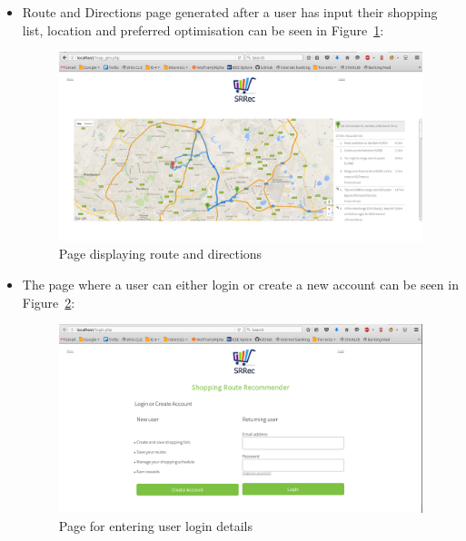 \documentclass[10pt,twocolumn]{witseiepaper}
\begin{document}
\begin{itemize}
			\item Route and Directions page generated after a user has input their shopping list, location and preferred optimisation can be seen in Figure~\ref{map page}:
			\begin{figure}[htbp]
				\centering
				\includegraphics[width =\columnwidth]{../images/map_gen_new.png}
				\caption{Page displaying route and directions}
				\label{map page}
			\end{figure}
			
			\item The page where a user can either login or create a new account can be seen in Figure~\ref{login page}:
			\begin{figure}[htbp]
				\centering
				\includegraphics[width = \columnwidth]{../images/login_new.png}
				\caption{Page for entering user login details}
				\label{login page}
			\end{figure}
				

\end{itemize}
\end{document}
